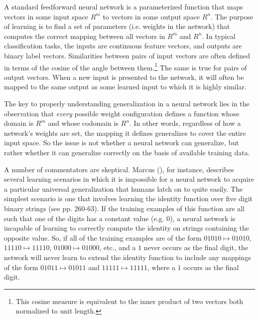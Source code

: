 A standard feedforward neural network is a parameterized function that maps vectors in some input space $R^m$ to vectors in some output space $R^n$. The purpose of learning is to find a set of parameters (i.e. weights in the network) that computes the correct mapping between all vectors in $R^m$ and $R^n$. In typical classification tasks, the inputs are continuous feature vectors, and outputs are binary label vectors. Similarities between pairs of input vectors are often defined in terms of the cosine of the angle between them.\footnote{This cosine measure is equivalent to the inner product of two vectors both normalized to unit length.} The same is true for pairs of output vectors. When a new input is presented to the network, it will often be mapped to the same output as some learned input to which it is highly similar. 

The key to properly understanding generalization in a neural network lies in the observation that \textit{every} possible weight configuration defines a function whose domain is $R^m$ and whose codomain is $R^n$. In other words, regardless of how a network's weights are set, the mapping it defines generalizes to cover the entire input space. So the issue is not whether a neural network can generalize, but rather whether it can generalize correctly on the basis of available training data. 

A number of commentators are skeptical. Marcus (\citeyear{Marcus:1998}), for instance, describes several learning scenarios in which it is impossible for a neural network to acquire a particular universal generalization that humans latch on to quite easily. The simplest scenario is one that involves learning the identity function over five digit binary strings (see pp. 260-63). If the training examples of this function are all such that one of the digits has a constant value (e.g. $0$), a neural network is incapable of learning to correctly compute the identity on strings containing the opposite value. So, if all of the training examples are of the form $01010 \mapsto 01010$, $11110 \mapsto 11110$, $01000 \mapsto 01000$, etc., and a $1$ never occurs as the final digit, the network will never learn to extend the identity function to include any mappings of the form $01011 \mapsto 01011$ and $11111 \mapsto 11111$, where a $1$ occurs as the final digit. 

